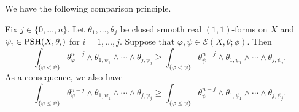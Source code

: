 We have the following comparison principle.
\begin{proposition}\label{prop:compa_princ}
    Fix $j\in \{0,\ldots,n\}$.
    Let $\theta_1,\ldots,\theta_j$ be closed smooth real $(1,1)$-forms on $X$ and $\psi_i\in \mathrm{PSH}(X,\theta_i)$ for $i=1,\ldots,j$. Suppose that $\varphi,\psi\in \mathcal{E}(X,\theta;\phi)$. Then
    \begin{equation}\label{eq:comp_princi1}
    \int_{\{\varphi<\psi\}} \theta_{\varphi}^{n-j} \wedge \theta_{1,\psi_1}\wedge \cdots \wedge \theta_{j,\psi_j}\geq \int_{\{\varphi<\psi\}} \theta_{\psi}^{n-j} \wedge \theta_{1,\psi_1}\wedge \cdots \wedge \theta_{j,\psi_j}.
    \end{equation}
    As a consequence, we also have
    \begin{equation}\label{eq:comp_princi12}
    \int_{\{\varphi\leq \psi\}} \theta_{\varphi}^{n-j} \wedge \theta_{1,\psi_1}\wedge \cdots \wedge \theta_{j,\psi_j}\geq \int_{\{\varphi\leq\psi\}} \theta_{\psi}^{n-j} \wedge \theta_{1,\psi_1}\wedge \cdots \wedge \theta_{j,\psi_j}.
    \end{equation}
\end{proposition}
